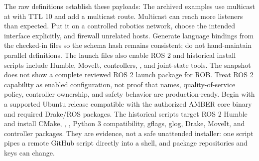 {}The raw definitions establish these payloads:\markdownRendererInterblockSeparator
{}\markdownRendererInterblockSeparator
{}The archived examples use multicast at  with TTL 10 and add a multicast route. Multicast can reach more listeners than expected. Put it on a controlled robotics network, choose the intended interface explicitly, and firewall unrelated hosts. Generate language bindings from the checked-in  files so the schema hash remains consistent; do not hand-maintain parallel definitions.\markdownRendererParagraphSeparator
{}The launch files also enable ROS 2 and historical install scripts include Humble, MoveIt, controllers, , and joint-state tools. The snapshot does not show a complete reviewed ROS 2 launch package for ROB. Treat ROS 2 capability as enabled configuration, not proof that names, quality-of-service policy, controller ownership, and safety behavior are production-ready.\markdownRendererInterblockSeparator
{}
\markdownRendererSectionEnd \markdownRendererSectionBegin
{}\markdownRendererInterblockSeparator
{}Begin with a supported Ubuntu release compatible with the authorized AMBER core binary and required Drake/ROS packages. The historical scripts target ROS 2 Humble and install CMake, , , Python 3 compatibility, gflags, glog, Drake, MoveIt, and controller packages. They are evidence, not a safe unattended installer: one script pipes a remote GitHub script directly into a shell, and package repositories and keys can change.\markdownRendererInterblockSeparator
